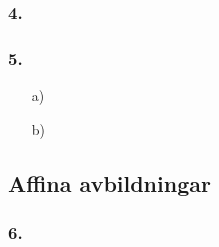 \documentclass{article}
\begin{document}
\subsubsection*{4.}

\subsubsection*{5.}
\begin{itemize}
	\item[a) ] 
	\item[b) ] 
\end{itemize}

\subsection*{Affina avbildningar}
\subsubsection*{6.}
\end{document}
